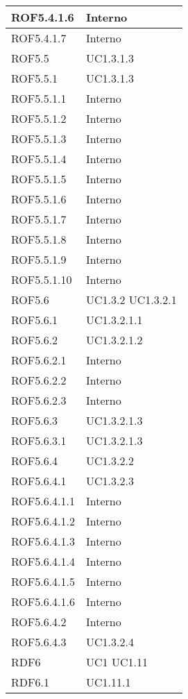 \begin{center}
\begin{longtable}{| p{4cm} | p{4cm} |}
\hline
ROF5.4.1.6   &  Interno \\
\hline
ROF5.4.1.7   &  Interno \\
\hline
ROF5.5   &  UC1.3.1.3  \\
\hline
ROF5.5.1   &  UC1.3.1.3  \\
\hline
ROF5.5.1.1   &  Interno \\
\hline
ROF5.5.1.2   &  Interno \\
\hline
ROF5.5.1.3   &  Interno \\
\hline
ROF5.5.1.4   &  Interno \\
\hline
ROF5.5.1.5   &  Interno \\
\hline
ROF5.5.1.6   &  Interno \\
\hline
ROF5.5.1.7   &  Interno \\
\hline
ROF5.5.1.8   &  Interno \\
\hline
ROF5.5.1.9   &  Interno \\
\hline
ROF5.5.1.10   &  Interno \\
\hline
ROF5.6   &  UC1.3.2 \newline UC1.3.2.1 \\
\hline
ROF5.6.1   &  UC1.3.2.1.1 \\
\hline
ROF5.6.2   &  UC1.3.2.1.2 \\
\hline
ROF5.6.2.1   &  Interno \\
\hline
ROF5.6.2.2   &  Interno \\
\hline
ROF5.6.2.3   &  Interno \\
\hline
ROF5.6.3   &  UC1.3.2.1.3 \\
\hline
ROF5.6.3.1   &  UC1.3.2.1.3 \\
\hline
ROF5.6.4   &  UC1.3.2.2 \\
\hline
ROF5.6.4.1   &  UC1.3.2.3 \\
\hline
ROF5.6.4.1.1   &  Interno \\
\hline
ROF5.6.4.1.2   &  Interno \\
\hline
ROF5.6.4.1.3   &  Interno \\
\hline
ROF5.6.4.1.4   &  Interno \\
\hline
ROF5.6.4.1.5   &  Interno \\
\hline
ROF5.6.4.1.6   &  Interno \\
\hline
ROF5.6.4.2   &  Interno \\
\hline
ROF5.6.4.3   &  UC1.3.2.4 \\
\hline
RDF6   &  UC1 \newline UC1.11 \\
\hline
RDF6.1   &  UC1.11.1 \\

\end{longtable}
\end{center}
